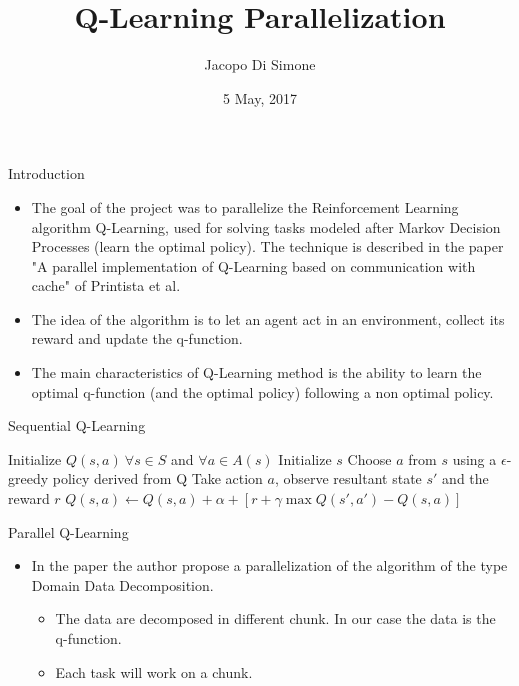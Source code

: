 \documentclass{beamer}
\begin{document}
\title{Q-Learning Parallelization}
\author{Jacopo Di Simone}
\date{5 May, 2017}
\beamertemplatenavigationsymbolsempty

\begin{frame}
\titlepage
\end{frame}

\begin{frame}{Introduction}
\begin{itemize}
\item The goal of the project was to parallelize the Reinforcement Learning algorithm Q-Learning, used for solving tasks modeled after Markov Decision Processes (learn the optimal policy). The technique is described in the paper "A parallel implementation of Q-Learning based on communication with cache" of Printista et al.
\item The idea of the algorithm is to let an agent act in an environment, collect its reward and update the q-function.
\item The main characteristics of Q-Learning method is the ability to learn the optimal q-function (and the optimal policy) following a non optimal policy.
\end{itemize}
\end{frame}

\begin{frame}{Sequential Q-Learning}
\begin{algorithmic}
\State Initialize $Q(s,a) \  \forall s \in S$ and $\forall a \in A(s)$
	\State Initialize $s$
	\Repeat
   		\State Choose $a$ from $s$ using a $\epsilon$-greedy policy derived from Q
   		\State Take action $a$, observe resultant state $s'$ and the reward $r$
   		\State $Q(s,a) \leftarrow Q(s,a) + \alpha + [ r + \gamma \max Q(s',a') - Q(s,a )]$
\EndFor
\end{algorithmic}
\end{frame}

\begin{frame}{Parallel Q-Learning}
\begin{itemize}
\item In the paper the author propose a parallelization of the algorithm of the type Domain Data Decomposition.
	\begin{itemize}
	\item The data are decomposed in different chunk. In our case the data is the q-function.
	\item Each task will work on a chunk.
	\end{itemize}
\end{itemize}
\end{frame}
\end{document}
